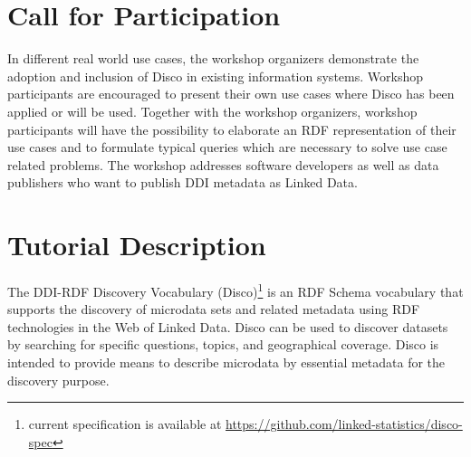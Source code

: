 \documentclass{llncs}
\begin{document}
%

\section{Call for Participation}

In different real world use cases, the workshop organizers demonstrate the adoption and inclusion of Disco in existing information systems. 
Workshop participants are encouraged to present their own use cases where Disco has been applied or will be used. 
Together with the workshop organizers, workshop participants will have the possibility to elaborate an RDF representation of their use cases and to formulate typical queries which are necessary to solve use case related problems.
The workshop addresses software developers as well as data publishers who want to publish DDI metadata as Linked Data.

\section{Tutorial Description}

The DDI-RDF Discovery Vocabulary (Disco)\footnote{current specification is available at \url{https://github.com/linked-statistics/disco-spec}}  is an RDF Schema vocabulary that supports the discovery of microdata sets and related metadata using RDF technologies in the Web of Linked Data. Disco can be used to discover datasets by searching for specific questions, topics, and geographical coverage. Disco is intended to provide means to describe microdata by essential metadata for the discovery purpose.
 
\end{document}
